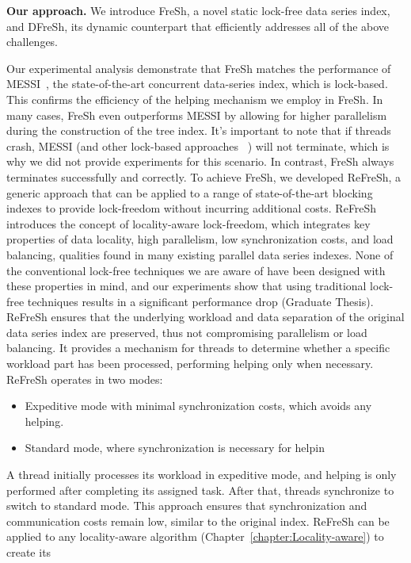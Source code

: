 \documentclass[a4paper,11pt,twoside,openany]{book}
\begin{document}
\noindent
{\bf Our approach.}
We introduce FreSh, a novel static lock-free data series index, and DFreSh, 
its dynamic counterpart that efficiently addresses all of the above challenges. 

Our experimental analysis demonstrate that FreSh matches the performance of 
MESSI~\cite{PFP21-I}, the state-of-the-art concurrent data-series index, which is lock-based. 
This confirms the efficiency of the helping mechanism we employ in FreSh. In many cases, 
FreSh even outperforms MESSI by allowing for higher parallelism during the construction of the
tree index.
It's important to note that if threads crash, MESSI (and other lock-based approaches
~\cite{peng2018paris,PFP21-I,PFP21-II,hercules}) will not terminate, which is 
why we did not provide experiments for this scenario. In contrast, 
FreSh always terminates successfully and correctly.
%
To achieve FreSh, we developed ReFreSh, a generic approach that can be applied to a
range of state-of-the-art blocking indexes to provide lock-freedom without 
incurring additional costs. 
%
ReFreSh introduces the concept of locality-aware lock-freedom, which integrates
key properties of data locality, high parallelism, low synchronization costs,
and load balancing, qualities found in many existing parallel data series indexes.
None of the conventional lock-free techniques we are aware of have been designed with
these properties in mind, and our experiments show that using traditional lock-free
techniques results in a significant performance drop (Graduate Thesis).
%
ReFreSh ensures that the underlying workload and data separation of the original data series
index are preserved, thus not compromising parallelism or load balancing. It provides a mechanism
for threads to determine whether a specific workload part has been processed, performing helping
only when necessary. ReFreSh operates in two modes:
\begin{itemize}
    \item Expeditive mode with minimal synchronization costs, which avoids any helping.
    \item Standard mode, where synchronization is necessary for helpin
\end{itemize}
%
A thread initially processes its workload in expeditive mode, and helping is only performed
after completing its assigned task. After that, threads synchronize to switch to standard mode.
This approach ensures that synchronization and communication costs remain low, similar to the
original index.
%
ReFreSh can be applied to any locality-aware algorithm (Chapter~\ref{chapter:Locality-aware}) to create its
\end{document}
